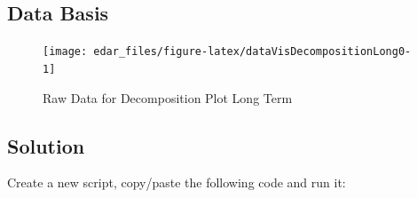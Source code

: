 \documentclass[
  a4paperpaper,
]{book}
\begin{document}
\hypertarget{data-basis-4}{%
\subsection{Data Basis}\label{data-basis-4}}

\begin{figure}
\texttt{[image: edar\_files/figure-latex/dataVisDecompositionLong0-1]} \caption{Raw Data for Decomposition Plot Long Term}\label{fig:dataVisDecompositionLong0}
\end{figure}

\newpage

\hypertarget{solution-4}{%
\subsection{Solution}\label{solution-4}}

Create a new script, copy/paste the following code and run it:
\end{document}
